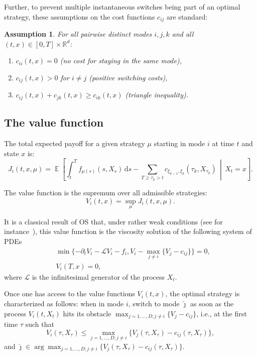 \documentclass[11pt,reqno,a4paper]{amsart}
\newtheorem{assumption}[theorem]{Assumption}
\theoremstyle{definition}
\numberwithin{equation}{section}
\newcommand{\Mid}{\,\middle\vert \,}
\newcommand{\diff}{\, \mathrm{d}}
\DeclareMathOperator{\E}{\mathbb{E}}
\DeclareMathOperator{\1}{\mathbbm{1}}
\begin{document}
Further, to prevent multiple instantaneous switches being part of an optimal strategy, these assumptions on the cost functions $c_{ij}$ are standard:
\begin{assumption}\label{ass:costs}
  For all pairwise distinct modes $i, j, k$ and all $(t,x) \in [0,T] \times \mathbb{R}^d$:
  \begin{enumerate}
    \item $c_{ii}(t,x) = 0$ (no cost for staying in the same mode),
    \item $c_{ij}(t,x) > 0$ for $i \neq j$ (positive switching costs),
    \item $c_{ij}(t,x) + c_{jk}(t,x) \geq c_{ik}(t,x)$ (triangle inequality).
  \end{enumerate}
\end{assumption}
\subsection{The value function}
The total expected payoff for a given strategy $\mu$ starting in mode $i$ at time $t$ and state $x$ is:
\begin{equation*}
  J_i(t,x,\mu) = \E \left[ \int_t^T f_{\mu(s)}(s,X_s) \diff s - \sum_{T \geq \tau_k > t} c_{\xi_{k-1},\xi_k}(\tau_k,X_{\tau_k}) \Mid X_t = x\right].
\end{equation*}

The value function is the supremum over all admissible strategies:
\begin{equation}\label{eq:OSPvalue}
  V_i(t,x) = \sup_{\mu} J_i(t,x,\mu).
\end{equation}

It is a classical result of OS that, under rather weak conditions (see for instance~\cite{tang1993finite}), this value function is the viscosity solution of the following system of PDEs
\begin{equation} \label{eq:formOS}
  \begin{split}
     & \min \{-\partial_t V_i - \mathcal{L} V_i - f_i, V_i - \max_{j \neq i} \{V_j - c_{ij}\}\} = 0, \\
     & V_i(T,x) = 0,
  \end{split}
\end{equation}
where $\mathcal{L}$ is the infinitesimal generator of the process $X_t$.

Once one has access to the value functions $V_i(t,x)$, the optimal strategy is characterized as follows: when in mode $i$, switch to mode $\hat{\jmath}$ as soon as the process $V_i(t, X_t)$ hits its obstacle $\max_{j=1,\dots,D;j\neq i}\{V_j - c_{ij}\}$, i.e., at the first time $\tau$ such that
\begin{equation}\label{eq:optimal}
  V_i(\tau, X_{\tau}) \leq \max_{j=1,\dots,D;j\neq i} \{V_j(\tau,X_{\tau})- c_{ij}(\tau,X_{\tau})\},
\end{equation}
and $\hat{\jmath} \in \arg \max_{j=1,\dots,D;j\neq i} \{V_j(\tau,X_\tau)- c_{ij}(\tau,X_\tau)\}$.
\end{document}

